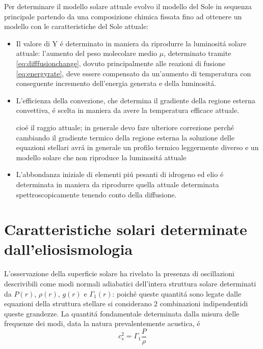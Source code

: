 \documentclass[../main.tex]{subfiles}
\begin{document}
Per determinare il modello solare attuale evolvo il modello del Sole in sequenza principale partendo da una composizione chimica fissata fino ad ottenere un modello con le caratteristiche del Sole attuale:
\begin{itemize}
\item Il valore di Y \'e determinato in maniera da riprodurre la luminosit\'a solare attuale: l'aumento del peso molecolare medio $\mu$, determinato tramite \eqref{eq:difffusionchange}, dovuto principalmente alle reazioni di fusione \eqref{eq:energyrate}, deve essere compensato da un'aumento di temperatura con conseguente incremento dell'energia generata e della luminosit\'a.

\item L'efficienza della convezione, che determina il gradiente della regione esterna convettiva, \'e scelta in maniera da avere la temperatura efficace attuale.

\begin{errata}
cio\'e il raggio attuale; in generale devo  fare ulteriore correzione perch\'e cambiando il gradiente termico della regione esterna la soluzione delle equazioni stellari avr\'a in generale un profilo termico leggermente diverso e un modello solare che non riproduce la luminosit\'a attuale
\end{errata}

\item L'abbondanza iniziale di elementi pi\'u pesanti di idrogeno ed elio \'e determinata in maniera da riprodurre quella attuale determinata spettroscopicamente tenendo conto della diffusione.
\end{itemize}




\section{Caratteristiche solari determinate dall'eliosismologia}

L'osservazione della superficie solare ha rivelato la presenza di oscillazioni descrivibili come modi normali adiabatici dell'intera struttura solare determinati da $P(r)$, $\rho(r)$, $g(r)$ e $\Gamma_1(r)$: poich\'e queste quantit\'a sono legate dalle equazioni della struttura stellare si considerano 2 combinazioni indipendentidi queste grandezze. La quantit\'a fondamentale determinata dalla misura delle frequenze dei modi, data la natura prevalentemente acustica, \'e
\begin{equation}
c_s^2=\Gamma_1\frac{P}{\rho}
\end{equation}
\end{document}

